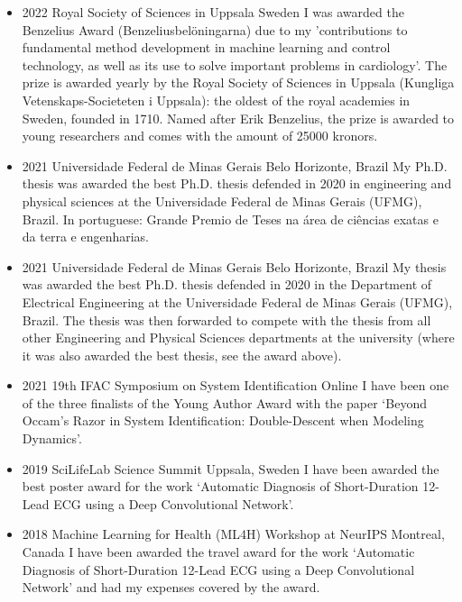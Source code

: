 \documentclass[10pt,A4]{article} %
\begin{document}
\begin{itemize}

    \item {}
    { 2022 }
    { Royal Society of Sciences in Uppsala }
    { Sweden }
    { I was awarded the Benzelius Award (Benzeliusbelöningarna) due to my 'contributions to fundamental method development in machine learning and control technology, as well as its use to solve important problems in cardiology'. The prize is awarded yearly by the Royal Society of Sciences in Uppsala (Kungliga Vetenskaps-Societeten i Uppsala): the oldest of the royal academies in Sweden, founded in 1710. Named after Erik Benzelius, the prize is awarded to young researchers and comes with the amount of 25000 kronors. }

    \item {}
    { 2021 }
    { Universidade Federal de Minas Gerais }
    { Belo Horizonte, Brazil }
    { My Ph.D. thesis was awarded the best Ph.D. thesis defended in 2020 in engineering and physical sciences at the Universidade Federal de Minas Gerais (UFMG), Brazil. In portuguese: Grande Premio de Teses na área de ciências exatas e da terra e engenharias. }

    \item {}
    { 2021 }
    { Universidade Federal de Minas Gerais }
    { Belo Horizonte, Brazil }
    { My thesis was awarded the best Ph.D. thesis defended in 2020 in the Department of Electrical Engineering at the Universidade Federal de Minas Gerais (UFMG), Brazil. The thesis was then forwarded to compete with the thesis from all other Engineering and Physical Sciences departments at the university (where it was also awarded the best thesis, see the award above). }

    \item {}
    { 2021 }
    { 19th IFAC Symposium on System Identification }
    { Online }
    { I have been one of the three finalists of the Young Author Award with the paper `Beyond Occam’s Razor in System Identification:  Double-Descent when Modeling Dynamics'. }

    \item {}
    { 2019 }
    { SciLifeLab Science Summit }
    { Uppsala, Sweden }
    { I have been awarded the best poster award for the work `Automatic Diagnosis of Short-Duration 12-Lead ECG using a Deep Convolutional Network'. }

    \item {}
    { 2018 }
    { Machine Learning for Health (ML4H) Workshop at NeurIPS }
    { Montreal, Canada }
    { I have been awarded the travel award for the work `Automatic Diagnosis of Short-Duration 12-Lead ECG using a Deep Convolutional Network' and had my expenses covered by the award. }

\end{itemize}
  
\end{document}

